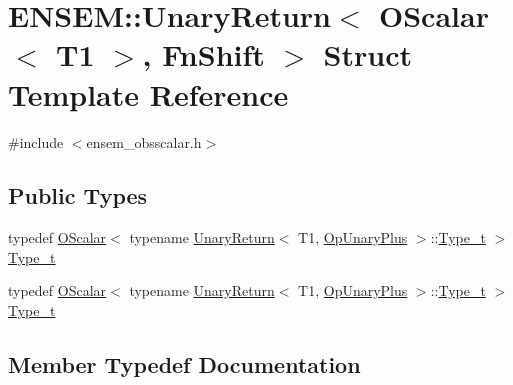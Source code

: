 \hypertarget{structENSEM_1_1UnaryReturn_3_01OScalar_3_01T1_01_4_00_01FnShift_01_4}{}\section{E\+N\+S\+EM\+:\+:Unary\+Return$<$ O\+Scalar$<$ T1 $>$, Fn\+Shift $>$ Struct Template Reference}
\label{structENSEM_1_1UnaryReturn_3_01OScalar_3_01T1_01_4_00_01FnShift_01_4}


{\ttfamily \#include $<$ensem\+\_\+obsscalar.\+h$>$}

\subsection*{Public Types}
\begin{DoxyCompactItemize}
\item 
typedef \mbox{\hyperlink{classENSEM_1_1OScalar}{O\+Scalar}}$<$ typename \mbox{\hyperlink{structENSEM_1_1UnaryReturn}{Unary\+Return}}$<$ T1, \mbox{\hyperlink{structENSEM_1_1OpUnaryPlus}{Op\+Unary\+Plus}} $>$\+::\mbox{\hyperlink{structENSEM_1_1UnaryReturn_3_01OScalar_3_01T1_01_4_00_01FnShift_01_4_a800574635cdc9328aeda8a2f34cd559d}{Type\+\_\+t}} $>$ \mbox{\hyperlink{structENSEM_1_1UnaryReturn_3_01OScalar_3_01T1_01_4_00_01FnShift_01_4_a800574635cdc9328aeda8a2f34cd559d}{Type\+\_\+t}}
\item 
typedef \mbox{\hyperlink{classENSEM_1_1OScalar}{O\+Scalar}}$<$ typename \mbox{\hyperlink{structENSEM_1_1UnaryReturn}{Unary\+Return}}$<$ T1, \mbox{\hyperlink{structENSEM_1_1OpUnaryPlus}{Op\+Unary\+Plus}} $>$\+::\mbox{\hyperlink{structENSEM_1_1UnaryReturn_3_01OScalar_3_01T1_01_4_00_01FnShift_01_4_a800574635cdc9328aeda8a2f34cd559d}{Type\+\_\+t}} $>$ \mbox{\hyperlink{structENSEM_1_1UnaryReturn_3_01OScalar_3_01T1_01_4_00_01FnShift_01_4_a800574635cdc9328aeda8a2f34cd559d}{Type\+\_\+t}}
\end{DoxyCompactItemize}


\subsection{Member Typedef Documentation}
\mbox{\label{structENSEM_1_1UnaryReturn_3_01OScalar_3_01T1_01_4_00_01FnShift_01_4_a800574635cdc9328aeda8a2f34cd559d}} 
